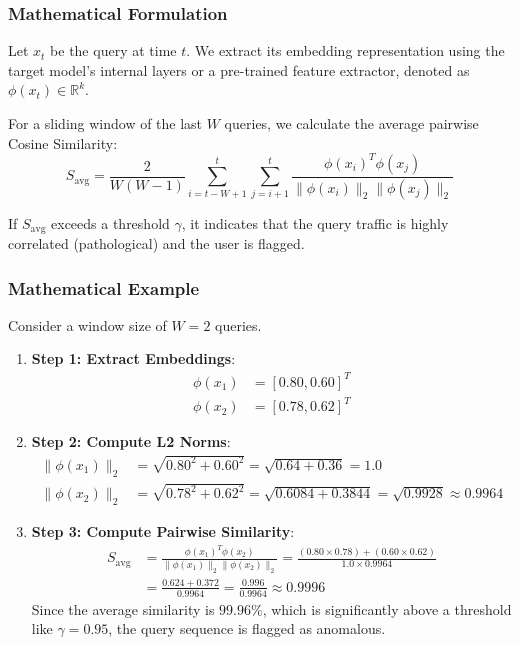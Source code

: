 \documentclass{article}
\begin{document}
\subsubsection{Mathematical Formulation}
Let $x_t$ be the query at time $t$. We extract its embedding representation using the target model's internal layers or a pre-trained feature extractor, denoted as $\phi(x_t) \in \mathbb{R}^k$.

For a sliding window of the last $W$ queries, we calculate the average pairwise Cosine Similarity:
\begin{equation}
    S_{\text{avg}} = \frac{2}{W(W-1)} \sum_{i=t-W+1}^t \sum_{j=i+1}^t \frac{\phi(x_i)^T \phi(x_j)}{\|\phi(x_i)\|_2 \|\phi(x_j)\|_2}
\end{equation}

If $S_{\text{avg}}$ exceeds a threshold $\gamma$, it indicates that the query traffic is highly correlated (pathological) and the user is flagged.

\subsubsection{Mathematical Example}
Consider a window size of $W=2$ queries.
\begin{enumerate}
    \item \textbf{Step 1: Extract Embeddings}:
    \begin{align*}
        \phi(x_1) &= [0.80, 0.60]^T \\
        \phi(x_2) &= [0.78, 0.62]^T
    \end{align*}
    
    \item \textbf{Step 2: Compute L2 Norms}:
    \begin{align*}
        \|\phi(x_1)\|_2 &= \sqrt{0.80^2 + 0.60^2} = \sqrt{0.64 + 0.36} = 1.0 \\
        \|\phi(x_2)\|_2 &= \sqrt{0.78^2 + 0.62^2} = \sqrt{0.6084 + 0.3844} = \sqrt{0.9928} \approx 0.9964
    \end{align*}
    
    \item \textbf{Step 3: Compute Pairwise Similarity}:
    \begin{align*}
        S_{\text{avg}} &= \frac{\phi(x_1)^T \phi(x_2)}{\|\phi(x_1)\|_2 \|\phi(x_2)\|_2} = \frac{(0.80 \times 0.78) + (0.60 \times 0.62)}{1.0 \times 0.9964} \\
        &= \frac{0.624 + 0.372}{0.9964} = \frac{0.996}{0.9964} \approx 0.9996
    \end{align*}
    Since the average similarity is $99.96\%$, which is significantly above a threshold like $\gamma = 0.95$, the query sequence is flagged as anomalous.
\end{enumerate}
\end{document}
